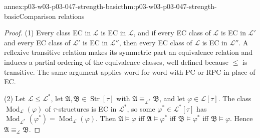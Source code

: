\begin{annexitem}{annex:p03-w03-p03-047-strength-basic}{thm:p03-w03-p03-047-strength-basic}{Comparison relations}
\begin{proof}
(1) Every class EC in \(\mathscr L\) is EC in \(\mathscr L\), and if every
EC class of \(\mathscr L\) is EC in \(\mathscr L'\) and every EC class of
\(\mathscr L'\) is EC in \(\mathscr L''\), then every EC class of
\(\mathscr L\) is EC in \(\mathscr L''\).  A reflexive transitive relation
makes its symmetric part an equivalence relation and induces a partial
ordering of the equivalence classes, well defined because \(\le\) is
transitive.  The same argument applies word for word with PC or RPC in place
of EC.

(2) Let \(\mathscr L\le\mathscr L^*\), let
\(\mathfrak A,\mathfrak B\in\operatorname{Str}[\tau]\) with
\(\mathfrak A\equiv_{\mathscr L^*}\mathfrak B\), and let
\(\varphi\in\mathscr L[\tau]\).  The class
\(\operatorname{Mod}_{\mathscr L}(\varphi)\) of \(\tau\)-structures is EC in
\(\mathscr L^*\), so some \(\varphi^*\in\mathscr L^*[\tau]\) has
\(\operatorname{Mod}_{\mathscr L^*}(\varphi^*)=\operatorname{Mod}_{\mathscr L}(\varphi)\).
Then \(\mathfrak A\models\varphi\) iff \(\mathfrak A\models\varphi^*\) iff
\(\mathfrak B\models\varphi^*\) iff \(\mathfrak B\models\varphi\).  Hence
\(\mathfrak A\equiv_{\mathscr L}\mathfrak B\).
\end{proof}
\end{annexitem}

